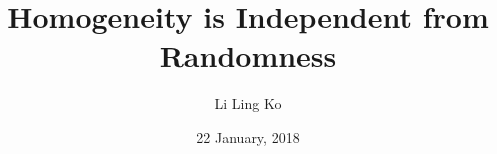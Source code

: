 \documentclass[notes]{beamer}
\title{Homogeneity is Independent from Randomness}
\author{Li Ling Ko}
\institute{University of Notre Dame}
\date{22 January, 2018}
\begin{document}
\begin{frame}
  \titlepage
\end{frame}





\end{document}
